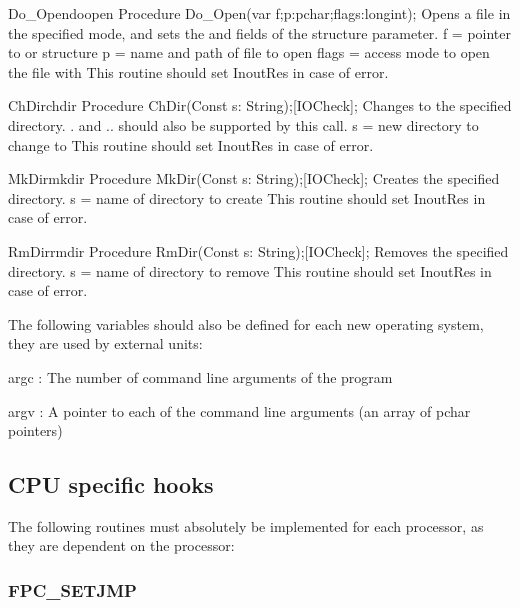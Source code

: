 \documentclass [a4paper,12pt]{article}
\begin{document}
\begin{procedurel}{Do{\_}Open}{doopen}
\Declaration
Procedure Do{\_}Open(var f;p:pchar;flags:longint);
\Description
Opens a file in the specified mode, and sets the
 and  fields of the 
structure parameter.
\Parameters
f = pointer to  or  structure
p = name and path of file to open
flags = access mode to open the file with
\Notes
This routine should set InoutRes in case of error.
\end{procedurel}

\begin{procedurel}{ChDir}{chdir}
\Declaration
Procedure ChDir(Const s: String);[IOCheck];
\Description
Changes to the specified directory. . and ..
should also be supported by this call.
\Parameters
s = new directory to change to
\Notes
This routine should set InoutRes in case of error.
\end{procedurel}


\begin{procedurel}{MkDir}{mkdir}
\Declaration
Procedure MkDir(Const s: String);[IOCheck];
\Description
Creates the specified directory.
\Parameters
s = name of directory to create
\Notes
This routine should set InoutRes in case of error.
\end{procedurel}


\begin{procedurel}{RmDir}{rmdir}
\Declaration
Procedure RmDir(Const s: String);[IOCheck];
\Description
Removes the specified directory.
\Parameters
s = name of directory to remove
\Notes
This routine should set InoutRes in case of error.
\end{procedurel}


The following variables should also be defined for each new operating
system, they are used by external units:

\noindent
argc : The number of command line arguments of the program

\noindent
argv : A pointer to each of the command line arguments (an array of pchar
pointers)

\subsection{CPU specific hooks}
\label{subsec:mylabel9}

The following routines must absolutely be implemented for each processor, as
they are dependent on the processor:

\subsubsection{FPC{\_}SETJMP}
\label{subsubsec:mylabel30}
\end{document}
